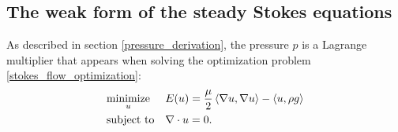 

\subsection{The weak form of the steady Stokes equations}
As described in section \ref{pressure_derivation}, the pressure $p$ is a Lagrange multiplier that appears
when solving the optimization problem \eqref{stokes_flow_optimization}:
\begin{equation*}
\begin{aligned}
& \underset{u}{\text{minimize}}
& & E(u) =  \frac{\mu}{2} \left<\nabla u, \nabla u\right> - \left<u, \rho g\right>\\
& \text{subject to}
& & \nabla\cdot u = 0.
\end{aligned}
\end{equation*}

